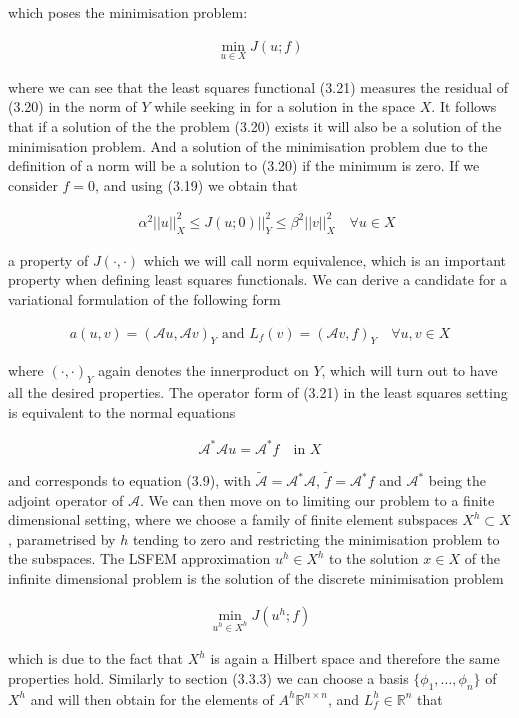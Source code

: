 \documentclass[../draft_1.tex]{subfiles}
\begin{document}
which poses the minimisation problem:
 \begin{ceqn}
\begin{align}
\min_{u \in X} J(u; f)
\end{align}
\end{ceqn}
where we can see that the least squares functional (3.21) measures the residual of (3.20) in the norm of $Y$ while seeking in for a solution in the space $X$. It follows that if a solution of the the problem (3.20) exists it will also be a solution of the minimisation problem. And a solution of the minimisation problem due to the definition of a norm will be a solution to (3.20) if the minimum is zero. If we consider $f = 0$, and using (3.19) we obtain that 
\begin{ceqn}
	\begin{align}
	\quad \alpha^2 || u ||_X^2 \leq J(u; 0)  ||_Y^2 \leq \beta^2 || v ||_X^2 \quad \forall u \in X
	\end{align} 
\end{ceqn}
a property of $J(\cdot, \cdot)$ which we will call norm equivalence, which is an important property when defining least squares functionals. We can derive a candidate for a variational formulation of the following form 
\begin{ceqn}
\begin{align}
a(u,v) = (\mathcal{A}u, \mathcal{A}v)_Y \text{ and } L_f(v) = (\mathcal{A}v, f)_Y \quad \forall u,v \in X
\end{align}
\end{ceqn}
where $(\cdot, \cdot)_Y$ again denotes the innerproduct on $Y$, which will turn out to have all the desired properties. The operator form of (3.21) in the least squares setting is equivalent to the normal equations
\begin{ceqn}
\begin{align}
\mathcal{A}^* \mathcal{A} u = \mathcal{A}^* f \quad \text{in } X
\end{align}
\end{ceqn}
and corresponds to equation (3.9), with $\tilde{\mathcal{A}} = \mathcal{A}^* \mathcal{A}$, $\tilde{f} = \mathcal{A}^* f $ and $\mathcal{A}^*$ being the adjoint operator of $\mathcal{A}$. We can then move on to limiting our problem to a finite dimensional setting, where we choose a family of finite element subspaces $X^h \subset X$, parametrised by $h$ tending to zero and restricting the minimisation problem to the subspaces. The LSFEM approximation $u^h \in X^h$ to the solution $x \in X$ of the infinite dimensional problem is the solution of the discrete minimisation problem 
\begin{ceqn}
\begin{align}
\min_{u^h \in X^h} J(u^h; f)
\end{align}
\end{ceqn}
which is due to the fact that $X^h$ is again a Hilbert space and therefore the same properties hold. Similarly to section (3.3.3) we can choose a basis $\{\phi_1, ..., \phi_n\}$ of $X^h$ and will then obtain for the elements of $A^h \mathbb{R}^{n \times n}$, and $L_f^h \in \mathbb{R}^n$ that
\end{document}
